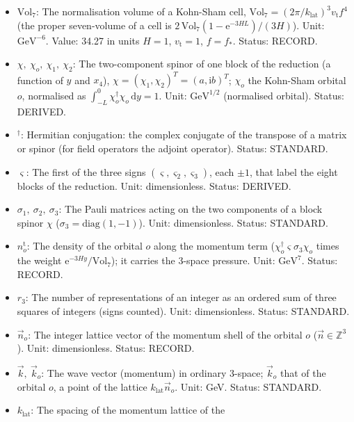 \documentclass[
  10pt,
]{article}
\begin{document}
\begin{itemize}
  Status: DERIVED.
\item
  \(\mathrm{Vol}_7\): The normalisation volume of a Kohn-Sham cell,
  \(\mathrm{Vol}_7 = (2\pi/k_{\mathrm{lat}})^3v_{\mathrm{t}}f^4\) (the
  proper seven-volume of a cell is
  \(2\,\mathrm{Vol}_7(1 - \mathrm{e}^{-3HL})/(3H)\)). Unit:
  \(\mathrm{GeV}^{-6}\). Value: 34.27 in units \(H = 1\),
  \(v_{\mathrm{t}} = 1\), \(f = f_*\). Status: RECORD.
\item
  \(\chi,\ \chi_o,\ \chi_1,\ \chi_2\): The two-component spinor of one
  block of the reduction (a function of \(y\) and \(x_4\)),
  \(\chi = (\chi_1, \chi_2)^T = (a, \mathrm{i}b)^T\); \(\chi_o\) the
  Kohn-Sham orbital \(o\), normalised as
  \(\int_{-L}^{0}\chi_o^\dagger\chi_o\,\mathrm{d}y = 1\). Unit:
  \(\mathrm{GeV}^{1/2}\) (normalised orbital). Status: DERIVED.
\item
  \({}^\dagger\): Hermitian conjugation: the complex conjugate of the
  transpose of a matrix or spinor (for field operators the adjoint
  operator). Status: STANDARD.
\item
  \(\varsigma\): The first of the three signs
  \((\varsigma, \varsigma_2, \varsigma_3)\), each \(\pm1\), that label
  the eight blocks of the reduction. Unit: dimensionless. Status:
  DERIVED.
\item
  \(\sigma_1,\ \sigma_2,\ \sigma_3\): The Pauli matrices acting on the
  two components of a block spinor \(\chi\)
  (\(\sigma_3 = \mathrm{diag}(1, -1)\)). Unit: dimensionless. Status:
  STANDARD.
\item
  \(n^{\mathrm{t}}_o\): The density of the orbital \(o\) along the
  momentum term (\(\chi_o^\dagger\varsigma\sigma_3\chi_o\) times the
  weight \(\mathrm{e}^{-3Hy}/\mathrm{Vol}_7\)); it carries the 3-space
  pressure. Unit: \(\mathrm{GeV}^{7}\). Status: RECORD.
\item
  \(r_3\): The number of representations of an integer as an ordered sum
  of three squares of integers (signs counted). Unit: dimensionless.
  Status: STANDARD.
\item
  \(\vec n_o\): The integer lattice vector of the momentum shell of the
  orbital \(o\) (\(\vec n \in \mathbb{Z}^3\)). Unit: dimensionless.
  Status: RECORD.
\item
  \(\vec k,\ \vec k_o\): The wave vector (momentum) in ordinary 3-space;
  \(\vec k_o\) that of the orbital \(o\), a point of the lattice
  \(k_{\mathrm{lat}}\vec n_o\). Unit: GeV. Status: STANDARD.
\item
  \(k_{\mathrm{lat}}\): The spacing of the momentum lattice of the

\end{itemize}
\end{document}
